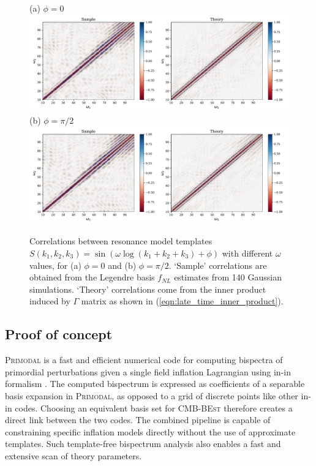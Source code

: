 \begin{figure}[htbp!] 
	\centering
	(a) $ \phi=0 $
	\includegraphics[width=\textwidth]{sinlog_template_correlations_new.pdf}
	(b) $ \phi=\pi/2 $
	\includegraphics[width=\textwidth]{coslog_template_correlations_new.pdf}
	\caption{Correlations between resonance model templates $S(k_1,k_2,k_3) = \sin(\omega\log(k_1+k_2+k_3)+\phi)$ with different $\omega$ values, for (a) $\phi = 0$ and (b) $\phi=\pi/2$. `Sample' correlations are obtained from the Legendre basis $f_{NL}$ estimates from 140 Gaussian simulations. `Theory' correlations come from the inner product induced by $\Gamma$ matrix as shown in (\ref{eqn:late_time_inner_product}).}
	\label{fig:sinlog_template_correlations}
\end{figure}


\subsection{Proof of concept} \label{section:proof_of_concept}


\textsc{Primodal} is a fast and efficient numerical code for computing bispectra of primordial perturbations given a single field inflation Lagrangian using in-in formalism \cite{Clarke2021}. The computed bispectrum is expressed as coefficients of a separable basis expansion in \textsc{Primodal}, as opposed to a grid of discrete points like other in-in codes. Choosing an equivalent basis set for \textsc{CMB-BEst} therefore creates a direct link between the two codes. The combined pipeline is capable of constraining specific inflation models directly without the use of approximate templates. Such template-free bispectrum analysis also enables a fast and extensive scan of theory parameters.

